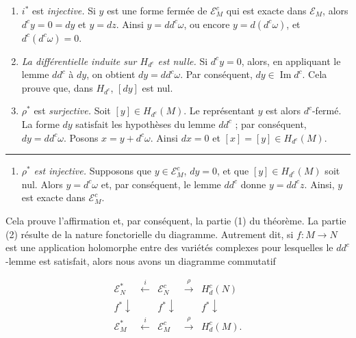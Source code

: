 \documentclass[
  french,
  a3paper,
  a3paper]{extarticle}
\providecommand{\tightlist}{%
  \setlength{\itemsep}{0pt}\setlength{\parskip}{0pt}}
\begin{document}
\begin{enumerate}
\def\labelenumi{\alph{enumi})}
\setcounter{enumi}{1}
\item
  \(i^*\) est \emph{injective.} Si \(y\) est une forme fermée de
  \(\mathscr E_M^c\) qui est exacte dans \(\mathscr E_M\), alors
  \(d^cy=0=dy\) et \(y=dz\). Ainsi \(y=dd^c\omega\), ou encore
  \(y=d(d^c\omega)\), et \(d^c(d^c\omega)=0\).
\item
  \emph{La différentielle induite sur \(H_{d^c}\) est nulle.} Si
  \(d^cy=0\), alors, en appliquant le lemme \(dd^c\) à \(dy\), on
  obtient \(dy=dd^c\omega\). Par conséquent,
  \(dy\in\operatorname{Im}d^c\). Cela prouve que, dans \(H_{d^c}\),
  \([dy]\) est nul.
\item
  \(\rho^*\) est \emph{surjective.} Soit \([y]\in H_{d^c}(M)\). Le
  représentant \(y\) est alors \(d^c\)-fermé. La forme \(dy\) satisfait
  les hypothèses du lemme \(dd^c\) ; par conséquent, \(dy=dd^c\omega\).
  Posons \(x=y+d^c\omega\). Ainsi \(dx=0\) et \([x]=[y]\in H_{d^c}(M)\).
\end{enumerate}

\clearpage



\par

\vspace{0.7mm}\hrule\vspace{1.6mm}

\fontsize{9}{11}\selectfont

\begin{enumerate}
\def\labelenumi{\alph{enumi})}
\setcounter{enumi}{4}
\tightlist
\item
  \(\rho^*\) \emph{est injective.} Supposons que
  \(y\in\mathcal{E}_M^c\), \(dy=0\), et que \([y]\in H_{d^c}(M)\) soit
  nul. Alors \(y=d^c\omega\) et, par conséquent, le lemme \(dd^c\) donne
  \(y=dd^c z\). Ainsi, \(y\) est exacte dans \(\mathcal{E}_M^c\).
\end{enumerate}

Cela prouve l'affirmation et, par conséquent, la partie (1) du théorème.
La partie (2) résulte de la nature fonctorielle du diagramme. Autrement
dit, si \(f:M\to N\) est une application holomorphe entre des variétés
complexes pour lesquelles le \(dd^c\)-lemme est satisfait, alors nous
avons un diagramme commutatif

\[\begin{array}{ccccc}\mathcal{E}_N^* & \xleftarrow{i} & \mathcal{E}_N^c & \xrightarrow{\rho} & H_d^c(N) \\ {\scriptstyle f^*}\downarrow & & {\scriptstyle f^*}\downarrow & & {\scriptstyle f^*}\downarrow \\ \mathcal{E}_M^* & \xleftarrow{i} & \mathcal{E}_M^c & \xrightarrow{\rho} & H_d^c(M).\end{array}\]
\end{document}
